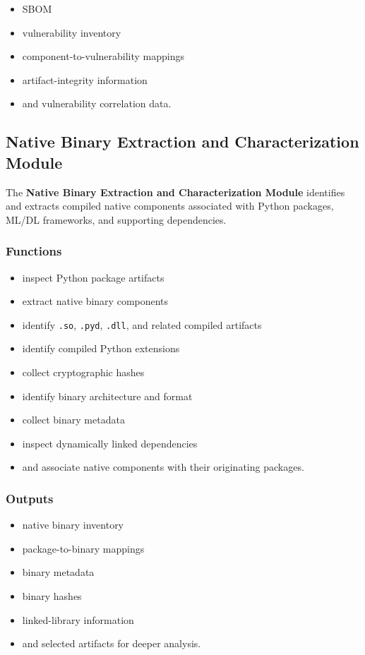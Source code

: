 \documentclass[
  12pt,
  letterpaper,
  oneside]{report}
\providecommand{\tightlist}{%
  \setlength{\itemsep}{0pt}\setlength{\parskip}{0pt}}
\begin{document}
\begin{itemize}
\tightlist
\item
  SBOM
\item
  vulnerability inventory
\item
  component-to-vulnerability mappings
\item
  artifact-integrity information
\item
  and vulnerability correlation data.
\end{itemize}

\subsection{Native Binary Extraction and Characterization Module}\label{1033-native-binary-extraction-and-characterization-module}

The \textbf{Native Binary Extraction and Characterization Module}
identifies and extracts compiled native components associated with
Python packages, ML/DL frameworks, and supporting dependencies.

\subsubsection{Functions}\label{functions-2}

\begin{itemize}
\tightlist
\item
  inspect Python package artifacts
\item
  extract native binary components
\item
  identify \texttt{.so}, \texttt{.pyd}, \texttt{.dll}, and related
  compiled artifacts
\item
  identify compiled Python extensions
\item
  collect cryptographic hashes
\item
  identify binary architecture and format
\item
  collect binary metadata
\item
  inspect dynamically linked dependencies
\item
  and associate native components with their originating packages.
\end{itemize}

\subsubsection{Outputs}\label{outputs-2}

\begin{itemize}
\tightlist
\item
  native binary inventory
\item
  package-to-binary mappings
\item
  binary metadata
\item
  binary hashes
\item
  linked-library information
\item
  and selected artifacts for deeper analysis.
\end{itemize}
\end{document}
